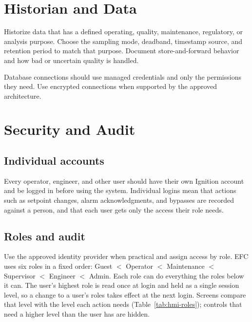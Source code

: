 \section{Historian and Data}
Historize data that has a defined operating, quality, maintenance, regulatory, or analysis purpose. Choose the sampling mode, deadband, timestamp source, and retention period to match that purpose. Document store-and-forward behavior and how bad or uncertain quality is handled.

Database connections should use managed credentials and only the permissions they need. Use encrypted connections when supported by the approved architecture.

\section{Security and Audit}
\subsection*{Individual accounts}\label{sec:ignition-accounts}
Every operator, engineer, and other user should have their own Ignition account and be logged in before using the system. Individual logins mean that actions such as setpoint changes, alarm acknowledgments, and bypasses are recorded against a person, and that each user gets only the access their role needs.

\subsection*{Roles and audit}\label{sec:ignition-roles}
Use the approved identity provider when practical and assign access by role. EFC uses six roles in a fixed order: Guest $<$ Operator $<$ Maintenance $<$ Supervisor $<$ Engineer $<$ Admin. Each role can do everything the roles below it can. The user's highest role is read once at login and held as a single session level, so a change to a user's roles takes effect at the next login. Screens compare that level with the level each action needs (Table~\ref{tab:hmi-roles}); controls that need a higher level than the user has are hidden. \newmark

